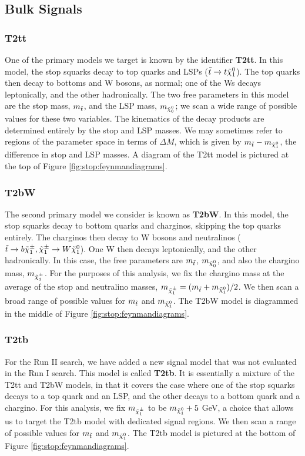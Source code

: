\subsection{Bulk Signals}
\label{ssec:stop:sigbulk}

\subsubsection*{T2tt}

One of the primary models we target is known by the identifier
\textbf{T2tt}. In this model, the stop squarks decay to top quarks and
LSPs ($\tilde{t} \rightarrow t \tilde{\chi}^0_1$). The top quarks then decay to
bottoms and W bosons, as normal; one of the Ws decays leptonically,
and the other hadronically. The two free parameters in this model are
the stop mass, $m_{\tilde{t}}$, and the LSP mass, $m_{\tilde{\chi}^0_0}$; we
scan a wide range of possible values for these two variables. The
kinematics of the decay products are determined entirely by the stop
and LSP masses. We may sometimes refer to regions of the parameter
space in terms of $\Delta M$, which is given by $m_{\tilde{t}} - m_{\tilde{\chi}^0_1}$, the
difference in stop and LSP masses. A diagram of the T2tt model is
pictured at the top of Figure \ref{fig:stop:feynmandiagrams}.

\subsubsection*{T2bW}

The second primary model we consider is known as \textbf{T2bW}. In this
model, the stop squarks decay to bottom quarks and charginos, skipping
the top quarks entirely. The charginos then decay to W bosons and
neutralinos ($\tilde{t} \rightarrow b \tilde{\chi}^\pm_1, \tilde{\chi}^\pm_1 \rightarrow
W \tilde{\chi}^0_1$). One W then decays leptonically, and the other
hadronically. In this case, the free parameters are $m_{\tilde{t}}$,
$m_{\tilde{\chi}^0_0}$, and also the chargino mass, $m_{\tilde{\chi}^\pm_1}$. For the
purposes of this analysis, we fix the chargino mass at the average of
the stop and neutralino masses, $m_{\tilde{\chi}^\pm_1} = (m_{\tilde{t}}
+ m_{\tilde{\chi}^0_1}) / 2$. We then scan a broad range of possible values
for $m_{\tilde{t}}$ and $m_{\tilde{\chi}^0_1}$. The T2bW model is diagrammed in
the middle of Figure \ref{fig:stop:feynmandiagrams}.

\subsubsection*{T2tb}

For the Run II search, we have added a new signal model that was not
evaluated in the Run I search. This model is called \textbf{T2tb}. It
is essentially a mixture of the T2tt and T2bW models, in that it
covers the case where one of the stop squarks decays to a top quark
and an LSP, and the other decays to a bottom quark and a chargino. For
this analysis, we fix $m_{\tilde{\chi}^\pm_1}$ to be $m_{\tilde{\chi}^0_1} + 5$ GeV, a choice
that allows us to target the T2tb model with dedicated
signal regions. We then scan a range of possible values for $m_{\tilde{t}}$ and
$m_{\tilde{\chi}^0_1}$. The T2tb model is pictured at the bottom of Figure
\ref{fig:stop:feynmandiagrams}.

